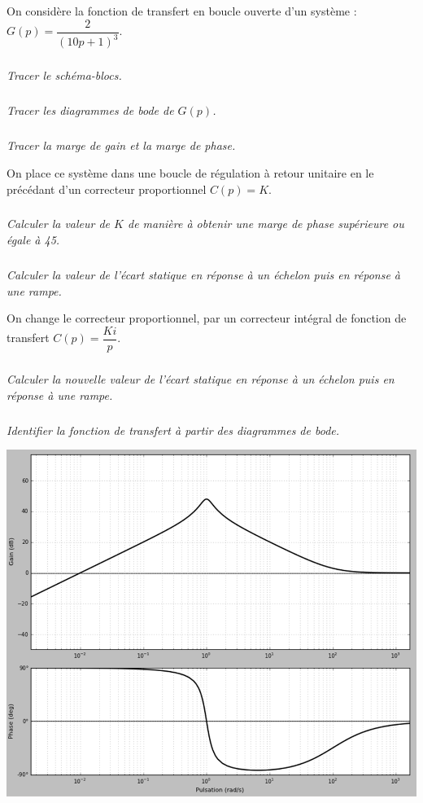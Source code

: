 \documentclass[10pt,fleqn]{article} %
\begin{document}

\vspace{8cm}
\pagestyle{fancy}
\thispagestyle{plain}

\def\columnseprulecolor{\color{ocre}}
\setlength{\columnseprule}{0.4pt} 

\def\pathfig{images}

\begin{multicols}{2}
On considère la fonction de transfert en boucle ouverte d’un système :
$G(p)=\dfrac{2}{\left( 10p+1\right)^3}$.

\subparagraph{}\textit{Tracer le schéma-blocs.}

\subparagraph{}\textit{Tracer les diagrammes de bode de $G(p)$.}
\subparagraph{}\textit{Tracer la marge de gain et la marge de phase.}

On place ce système dans une boucle de régulation à retour unitaire en le précédant d’un correcteur proportionnel $C(p)=K$.

\subparagraph{}\textit{Calculer la valeur de $K$ de manière à obtenir une marge de phase supérieure ou égale à 45\degres.}
\subparagraph{}\textit{Calculer la valeur de l’écart statique en réponse à un échelon puis en réponse à une rampe.}

On change le correcteur proportionnel, par un correcteur intégral de fonction de transfert $C(p)=\dfrac{Ki}{p}$.

\subparagraph{}\textit{Calculer la nouvelle valeur de l’écart statique en réponse à un échelon puis en réponse à une rampe.}

 
\end{multicols}

\newpage

\subparagraph{}\textit{Identifier la fonction de transfert à partir des diagrammes de bode.}



\begin{center}
\includegraphics[width=.9\linewidth]{images/fig_01}
\end{center}
\end{document}
